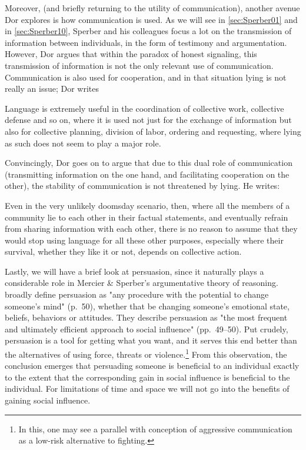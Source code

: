 Moreover, (and briefly returning to the utility of communication), another avenue Dor explores is how communication is used. As we will see in \cref{sec:Sperber01} and in \cref{sec:Sperber10}, Sperber and his colleagues focus a lot on the transmission of information between individuals, in the form of testimony and argumentation. However, Dor argues that within the paradox of honest signaling, this transmission of information is not the only relevant use of communication. Communication is also used for cooperation, and in that situation lying is not really an issue; Dor writes
\begin{quoting}
    Language is extremely useful in the coordination of collective work, collective defense and so on, where it is used not just for the exchange of information but also for collective planning, division of labor, ordering and requesting, where lying as such does not seem to play a major role.
    \hfill \citep[p.~51]{Dor17}
\end{quoting}
Convincingly, Dor goes on to argue that due to this dual role of communication (transmitting information on the one hand, and facilitating cooperation on the other), the stability of communication is not threatened by lying. He writes:
\begin{quoting}
    Even in the very unlikely doomsday scenario, then, where all the members of a community lie to each other in their factual statements, and eventually refrain from sharing information with each other, there is no reason to assume that they would stop using language for all these other purposes, especially where their survival, whether they like it or not, depends on collective action.
    \hfill \citep[p.~52]{Dor17}
\end{quoting}

Lastly, we will have a brief look at persuasion, since it naturally plays a considerable role in Mercier \& Sperber's argumentative theory of reasoning.
\citet{Brinol09} broadly define persuasion as "any procedure with the potential to change someone's mind" (p.~50),
whether that be changing someone's emotional state, beliefs, behaviors or attitudes.
They describe persuasion as "the most frequent and ultimately efficient approach to social influence" (pp.~49--50). Put crudely, persuasion is a tool for getting what you want, and it serves this end better than the alternatives of using force, threats or violence.\footnote{In this, one may see a parallel with  conception of aggressive communication as a low-risk alternative to fighting.}
From this observation, the conclusion emerges that persuading someone is beneficial to an individual exactly to the extent that the corresponding gain in social influence is beneficial to the individual.
For limitations of time and space we will not go into the benefits of gaining social influence.
